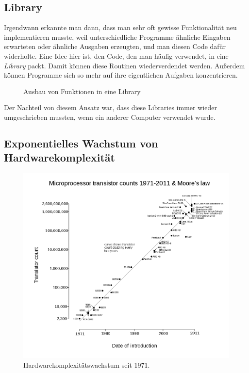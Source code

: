 \documentclass[ngerman,abstract=true]{scrartcl}
\begin{document}
\subsection{Library}

Irgendwann erkannte man dann, dass man sehr oft gewisse Funktionalität neu implementieren musste, weil unterschiedliche Programme ähnliche Eingaben erwarteten oder ähnliche Ausgaben erzeugten, und man diesen Code dafür widerholte. Eine Idee hier ist, den Code, den man häufig verwendet, in eine \emph{Library} packt. Damit können diese Routinen wiederverdendet werden. Außerdem können Programme sich so mehr auf ihre eigentlichen Aufgaben konzentrieren.

\begin{figure}[h]\centering
{}
\caption{Ausbau von Funktionen in eine Library}\label{fig:library}
\end{figure}

Der Nachteil von diesem Ansatz war, dass diese Libraries immer wieder umgeschrieben mussten, wenn ein anderer Computer verwendet wurde.

\subsection{Exponentielles Wachstum von Hardwarekomplexität}

\begin{figure}\centering
\includegraphics[trim={1.8cm 1.8cm 1cm 3.6cm},clip,width=0.8\linewidth]{media/mooreslaw}
\caption{Hardwarekomplexitätswachstum seit 1971.}\label{fig:mooreslaw}
\end{figure}
\end{document}
